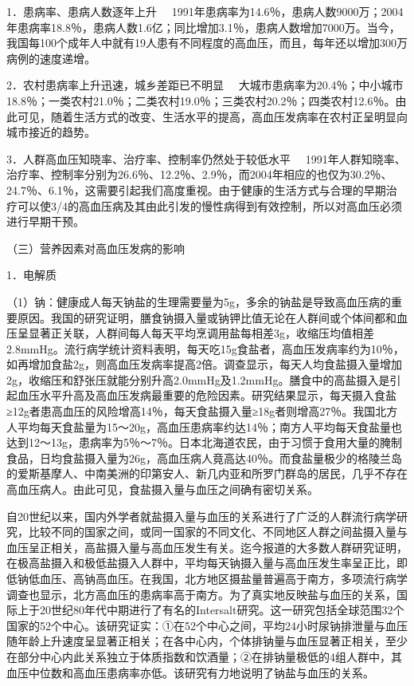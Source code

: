 {1．患病率、患病人数逐年上升}
　1991年患病率为14.6％，患病人数9000万；2004年患病率18.8％，患病人数1.6亿；同比增加3.1％，患病人数增加7000万。当今，我国每100个成年人中就有19人患有不同程度的高血压，而且，每年还以增加300万病例的速度递增。

{2．农村患病率上升迅速，城乡差距已不明显}
　大城市患病率为20.4％；中小城市18.8％；一类农村21.0％；二类农村19.0％；三类农村20.2％；四类农村12.6％。由此可见，随着生活方式的改变、生活水平的提高，高血压发病率在农村正呈明显向城市接近的趋势。

{3．人群高血压知晓率、治疗率、控制率仍然处于较低水平}
　1991年人群知晓率、治疗率、控制率分别为26.6％、12.2％、2.9％，而2004年相应的也仅为30.2％、24.7％、6.1％，这需要引起我们高度重视。由于健康的生活方式与合理的早期治疗可以使3/4的高血压病及其由此引发的慢性病得到有效控制，所以对高血压必须进行早期干预。

（三）营养因素对高血压发病的影响

{1．电解质}

（1）钠：健康成人每天钠盐的生理需要量为5g，多余的钠盐是导致高血压病的重要原因。我国的研究证明，膳食钠摄入量或钠钾比值无论在人群间或个体间都和血压呈显著正关联，人群间每人每天平均烹调用盐每相差3g，收缩压均值相差2.8mmHg。流行病学统计资料表明，每天吃15g食盐者，高血压发病率约为10％，如再增加食盐2g，则高血压发病率提高2倍。调查显示，每天人均食盐摄入量增加2g，收缩压和舒张压就能分别升高2.0mmHg及1.2mmHg。膳食中的高盐摄入是引起血压水平升高及高血压发病最重要的危险因素。研究结果显示，每天摄入食盐≥12g者患高血压的风险增高14％，每天食盐摄入量≥18g者则增高27％。我国北方人平均每天食盐量为15～20g，高血压患病率约达14％；南方人平均每天食盐量也达到12～13g，患病率为5％～7％。日本北海道农民，由于习惯于食用大量的腌制食品，日均食盐摄入量为26g，高血压病人竟高达40％。而食盐量极少的格陵兰岛的爱斯基摩人、中南美洲的印第安人、新几内亚和所罗门群岛的居民，几乎不存在高血压病人。由此可见，食盐摄入量与血压之间确有密切关系。

自20世纪以来，国内外学者就盐摄入量与血压的关系进行了广泛的人群流行病学研究，比较不同的国家之间，或同一国家的不同文化、不同地区人群之间盐摄入量与血压呈正相关，高盐摄入量与高血压发生有关。迄今报道的大多数人群研究证明，在极高盐摄入和极低盐摄入人群中，平均每天钠摄入量与高血压发生率呈正比，即低钠低血压、高钠高血压。在我国，北方地区摄盐量普遍高于南方，多项流行病学调查也显示，北方高血压的患病率高于南方。为了真实地反映盐与血压的关系，国际上于20世纪80年代中期进行了有名的Intersalt研究。这一研究包括全球范围32个国家的52个中心。该研究证实：①在52个中心之间，平均24小时尿钠排泄量与血压随年龄上升速度呈显著正相关；在各中心内，个体排钠量与血压显著正相关，至少在部分中心内此关系独立于体质指数和饮酒量；②在排钠量极低的4组人群中，其血压中位数和高血压患病率亦低。该研究有力地说明了钠盐与血压的关系。

